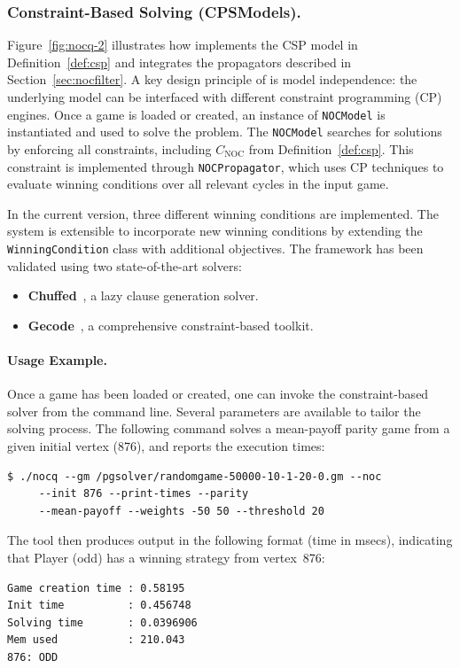 \documentclass[a4paper,UKenglish,cleveref, autoref, thm-restate, anonymous]{lipics-v2021}
\begin{document}
\subsubsection*{Constraint-Based Solving (CPSModels).}

Figure~\ref{fig:nocq-2} illustrates how \nocq implements the CSP model in Definition~\ref{def:csp} and integrates the \noc propagators described in Section~\ref{sec:nocfilter}. A key design principle of \nocq is model independence: the underlying model can be interfaced with different constraint programming (CP) engines.
%
Once a game is loaded or created, an instance of \texttt{NOCModel} is instantiated and used to solve the problem. The \texttt{NOCModel} searches for solutions by enforcing all constraints, including $C_{\text{NOC}}$ from Definition~\ref{def:csp}. This constraint is implemented through \texttt{NOCPropagator}, which uses CP techniques to evaluate winning conditions over all relevant cycles in the input game.

In the current version, three different winning conditions are implemented. The system is extensible to incorporate new winning conditions by extending the \texttt{WinningCondition} class with additional objectives. The framework has been validated using two state-of-the-art solvers:

\begin{itemize}
    \item \textbf{Chuffed}~\cite{chuffed:2018}, a lazy clause generation solver.
    \item \textbf{Gecode}~\cite{Gecode:2019}, a comprehensive constraint-based toolkit.
\end{itemize}

\paragraph{Usage Example.}
Once a game has been loaded or created, one can invoke the constraint-based solver from the command line. Several parameters are available to tailor the solving process. The following command solves a mean-payoff parity game from a given initial vertex (876), and reports the execution times:

\begin{lstlisting}
$ ./nocq --gm /pgsolver/randomgame-50000-10-1-20-0.gm --noc
     --init 876 --print-times --parity
     --mean-payoff --weights -50 50 --threshold 20
\end{lstlisting}

\noindent The tool then produces output in the following format (time in msecs), indicating that Player \odd (odd) has a winning strategy from vertex~876:
\begin{lstlisting}
Game creation time : 0.58195
Init time          : 0.456748
Solving time       : 0.0396906
Mem used           : 210.043
876: ODD
\end{lstlisting}
\end{document}
